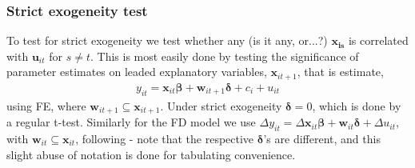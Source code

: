 
\subsubsection*{Strict exogeneity test}

To test for strict exogeneity we test whether any (is it any, or...?) $\bm{x_{is}}$ is correlated with $\bm{u}_{it}$ for $s \neq t$. This is most easily done by testing the significance of parameter estimates on leaded explanatory variables, $\bm{x}_{it+1}$, that is estimate, 
\begin{align*}
    y_{it} = \bm{x}_{it} \bm{\beta} + \bm{w}_{it+1} \bm{\delta} + c_i + u_{it}
\end{align*} 
using FE, where $\bm{w}_{it+1} \subseteq \bm{x}_{it+1}$. Under strict exogeneity $\bm{\delta} = 0$, which is done by a regular t-test. Similarly for the FD model we use $\Delta y_{it} = \Delta \bm{x}_{it} \bm{\beta} + \bm{w}_{it} \bm{\delta} + \Delta u_{it}$, with $\bm{w}_{it} \subseteq \bm{x}_{it}$, following \cite[Chapter~10]{wooldridgeEconometricAnalysisCross2010} - note that the respective $\bm{\delta}$'s are different, and this slight abuse of notation is done for tabulating convenience.


